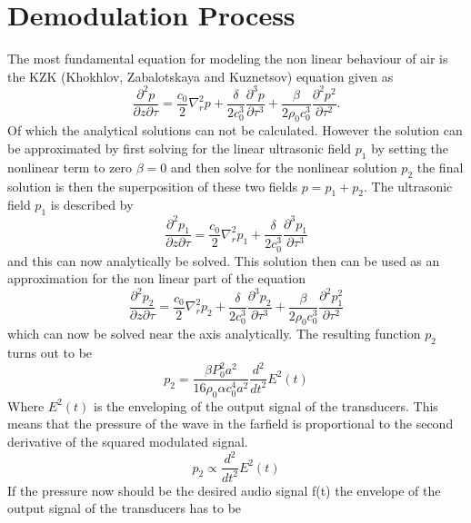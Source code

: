 \section{Demodulation Process}\label{3_sec:demodulation}
The most fundamental equation for modeling the non linear behaviour of air is the KZK (Khokhlov, Zabalotskaya and Kuznetsov) equation \cite{MIT_Ultrasound} given as
\begin{equation}
    \frac{\partial^2 p}{\partial z \partial \tau} 
    = 
    \frac{c_0}{2} \nabla^2_rp
    + 
    \frac{\delta}{2c_0^3}\frac{\partial^3 p}{\partial \tau^3} 
    + 
    \frac{\beta}{2\rho_0c_0^3}\frac{\partial^2 p^2}{\partial \tau^2}.
\end{equation}
Of which the analytical solutions can not be calculated.
However the solution can be approximated by first solving for the linear ultrasonic field $p_1$ by setting the nonlinear term to zero $\beta = 0$ and then solve for the nonlinear solution $p_2$ the final solution is then the superposition of these two fields $p = p_1 + p_2$.
The ultrasonic field $p_1$ is described by 
\begin{equation}
     \frac{\partial^2 p_1}{\partial z \partial \tau} 
    = 
    \frac{c_0}{2} \nabla^2_rp_1 
    + 
    \frac{\delta}{2c_0^3}\frac{\partial^3 p_1}{\partial \tau^3} 
\end{equation}
and this can now analytically be solved. 
This solution then can be used as an approximation for the non linear part of the equation
\begin{equation}
     \frac{\partial^2 p_2}{\partial z \partial \tau} 
    = 
    \frac{c_0}{2} \nabla^2_rp_2 
    + 
    \frac{\delta}{2c_0^3}\frac{\partial^3 p_2}{\partial \tau^3} 
    + 
    \frac{\beta}{2\rho_0c_0^3}\frac{\partial^2 p_1^2}{\partial \tau^2}
\end{equation}
which can now be solved near the axis analytically.
The resulting function $p_2$ turns out to be 
\begin{equation}
    p_2 = \frac{\beta P_0^2 a^2}{16 \rho_0 \alpha c_0^4 a^2}\frac{d^2}{dt^2} E^2(t)
\end{equation}
Where $E^2(t)$ is the enveloping of the output signal of the transducers. 
This means that the  pressure of the wave in the farfield is proportional to the second derivative of the squared modulated signal.
\begin{equation}
    p_2 \propto \frac{d^2}{dt^2} E^2(t)
\end{equation}
If the pressure now should be the desired audio signal f(t) the envelope of the output signal of the transducers has to be

